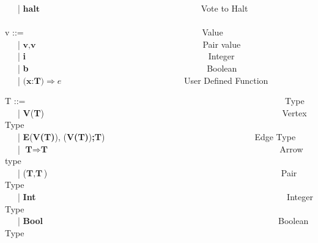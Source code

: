 \begin{frame}
{  \ \ \ |  $\textbf{halt}$ \ \ \ \ \ \ \ \ \ \ \ \ \  \ \ \ \ \ \ \ \ \ \ \ \ \ \ \ \ \ \ \ \ \ \ \ \  Vote to Halt \\
\ \\
  v ::= \ \ \ \ \ \ \ \ \ \ \ \ \ \ \ \ \ \ \ \ \ \ \ \ \ \ \ \ \ \ \ \ \ \ \ \ \ \ \ \ \ Value \\
    \ \ \ | $\textbf{v},\textbf{v}$ \ \ \ \ \ \ \ \ \ \ \ \ \ \ \ \ \ \ \ \ \ \ \ \ \ \ \ \ \ \ \ \ \ \ \ \ \ \ Pair value \\
    \ \ \ | \textbf{i} \ \ \ \ \ \ \ \ \ \ \ \ \ \ \ \  \ \ \ \ \ \ \ \ \ \ \ \ \ \ \ \ \ \ \ \ \ \ \ \ \ \ Integer \\
    \ \ \ | \textbf{b} \ \ \ \ \ \ \ \ \ \ \ \ \ \ \ \ \ \ \ \ \ \ \ \ \ \ \ \ \ \ \ \ \ \ \ \ \ \ \ \ \ Boolean \\
    \ \ \ | $\textbf{(x:T)} \Rightarrow e $ \ \ \ \ \ \ \ \ \ \ \ \ \ \ \ \ \ \ \ \ \ \ \ \ \ \ \ \  User Defined Function \\
    }
\end{frame}

\begin{frame}
  \tiny{
  T ::= \ \ \ \ \ \ \ \ \ \ \ \ \ \ \ \ \ \ \ \ \ \ \ \ \ \ \ \ \ \ \ \ \ \ \ \ \ \ \ \ \ \ \ \ \ \ \ \ \ \ \ \ \ \ \ \ \ \ \ \ Type \\
    \ \ \ | \textbf{V}(\textbf{T}) \ \ \ \ \ \ \ \ \ \ \ \ \ \ \ \ \ \ \ \ \ \ \ \ \ \ \ \ \ \ \ \ \ \ \ \ \ \ \ \ \ \ \ \ \ \ \ \ \ \ \ \ \ \ \ Vertex Type \\
    \ \ \ | \textbf{E}(\textbf{V(T)}), (\textbf{V(T)})\textbf{;T})\ \ \ \ \ \ \ \ \ \ \ \ \ \ \ \ \ \ \ \ \ \ \ \ \ \ \ \ \ \ \ \ \ \ \  Edge Type\\
    \ \ \ | $\textbf{T} \Rightarrow \textbf{T}$ \ \ \ \ \ \ \ \ \ \  \ \ \ \ \ \ \ \ \ \ \ \ \ \ \ \ \ \ \ \ \ \ \ \ \ \ \ \ \ \  \ \ \ \ \ \ \ \ \ \ \ \ \ Arrow type \\
    \ \ \ | ($\textbf{T}, \textbf{T}$) \ \ \ \ \ \ \ \ \ \ \ \ \ \ \ \ \ \ \ \ \ \ \ \ \ \ \ \ \ \ \ \ \ \ \ \ \ \ \ \ \ \ \ \ \ \ \ \ \ \ \ \ \ \ Pair Type \\
    \ \ \ | \textbf{Int} \ \ \ \ \ \ \ \ \ \ \ \ \ \ \ \ \ \ \ \ \ \ \ \ \ \ \ \ \ \ \ \ \ \ \ \ \ \ \ \ \ \ \ \ \ \ \ \ \ \ \ \ \ \ \ \ \ \ Integer Type \\
    \ \ \ | \textbf{Bool}\ \ \ \ \ \ \ \ \ \ \ \  \ \ \ \ \ \ \ \ \ \ \ \ \ \ \ \ \ \ \ \ \ \ \ \ \ \ \ \ \ \ \ \ \ \ \ \ \ \ \ \ \ \ \  Boolean Type
}
\end{frame}

